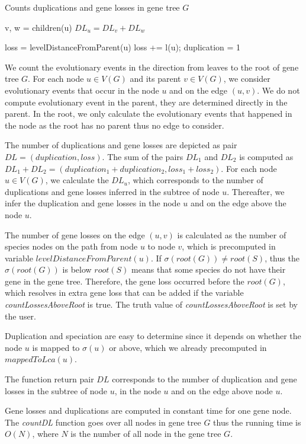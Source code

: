 \begin{algorithm}
\caption{Counts duplications and gene losses in gene tree $G$} 
\label{countDL}
\begin{algorithmic}[1]
		\State v, w = children(u)
		\State $DL_u = DL_v+DL_w$
	\EndIf

	\State loss = levelDistanceFromParent(u)
		\State loss += l(u); 
	\EndIf
		\State duplication = 1
	\EndIf
	
\EndFunction
\end{algorithmic}
\end{algorithm}

We count the evolutionary events in the direction from leaves to the root of gene tree $G$. For each node $u \in V(G)$ and its parent $v \in V(G)$, we consider evolutionary events that occur in the node $u$ and on the edge $(u, v)$. We do not compute evolutionary event in the parent, they are determined directly in the parent. In the root, we only calculate the evolutionary events that happened in the node as the root has no parent thus no edge to consider.

The number of duplications and gene losses are depicted as pair $DL = (duplication, loss)$. The sum of the pairs $DL_1$  and $DL_2$ is computed as $DL_1+DL_2=(duplication_1+duplication_2, loss_1+loss_2)$. For each node $u \in V(G)$, we calculate the $DL_u$, which corresponds to the number of duplications and gene losses inferred in the subtree of node $u$. Thereafter, we infer the duplication and gene losses in the node $u$ and on the edge above the node $u$.

The number of gene losses on the edge $(u, v)$ is calculated as the number of species nodes on the path from node $u$ to node $v$, which is precomputed in variable $levelDistanceFromParent(u)$. If $\sigma(root(G)) \ne root(S)$, thus the $\sigma(root(G))$ is below $root(S)$ means that some species do not have their gene in the gene tree. Therefore, the gene loss occurred before the $root(G)$, which resolves in extra gene loss that can be added if the variable \emph{countLossesAboveRoot} is true. The truth value of \emph{countLossesAboveRoot} is set by the user.

Duplication and speciation are easy to determine since it depends on whether the node $u$ is mapped to $\sigma(u)$ or above, which we already precomputed in $mappedToLca(u)$.

The function return pair $DL$ corresponds to the number of duplication and gene losses in the subtree of node $u$, in the node $u$ and on the edge above node $u$.

Gene losses and duplications are computed in constant time for one gene node. The \emph{countDL} function goes over all nodes in gene tree $G$ thus the running time is $O(N)$, where $N$ is the number of all node in the gene tree $G$.


